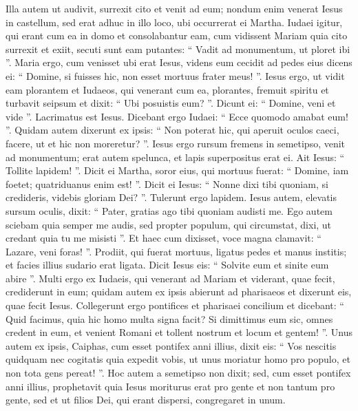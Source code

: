 \begin{biblechapter}
\begin{biblechapter}
\begin{biblechapter}
\begin{biblechapter}
\begin{biblechapter}
\begin{biblechapter}
\begin{biblechapter}
\begin{biblechapter}
\begin{biblechapter}
\begin{biblechapter}
\begin{biblechapter}
\verse Illa autem ut audivit, surrexit cito et venit ad eum; 
\verse nondum enim venerat Iesus in castellum, sed erat adhuc in illo loco, ubi occurrerat ei Martha. 
\verse Iudaei igitur, qui erant cum ea in domo et consolabantur eam, cum vidissent Mariam quia cito surrexit et exiit, secuti sunt eam putantes: “ Vadit ad monumentum, ut ploret ibi ”. 
\verse Maria ergo, cum venisset ubi erat Iesus, videns eum cecidit ad pedes eius dicens ei: “ Domine, si fuisses hic, non esset mortuus frater meus! ”. 
\verse Iesus ergo, ut vidit eam plorantem et Iudaeos, qui venerant cum ea, plorantes, fremuit spiritu et turbavit seipsum 
\verse et dixit: “ Ubi posuistis eum? ”. Dicunt ei: “ Domine, veni et vide ”. 
\verse Lacrimatus est Iesus. 
\verse Dicebant ergo Iudaei: “ Ecce quomodo amabat eum! ”. 
\verse Quidam autem dixerunt ex ipsis: “ Non poterat hic, qui aperuit oculos caeci, facere, ut et hic non moreretur? ”.
 \verse Iesus ergo rursum fremens in semetipso, venit ad monumentum; erat autem spelunca, et lapis superpositus erat ei. 
\verse Ait Iesus: “ Tollite lapidem! ”. Dicit ei Martha, soror eius, qui mortuus fuerat: “ Domine, iam foetet; quatriduanus enim est! ”. 
\verse Dicit ei Iesus: “ Nonne dixi tibi quoniam, si credideris, videbis gloriam Dei? ”. 
\verse Tulerunt ergo lapidem. Iesus autem, elevatis sursum oculis, dixit: “ Pater, gratias ago tibi quoniam audisti me. 
\verse Ego autem sciebam quia semper me audis, sed propter populum, qui circumstat, dixi, ut credant quia tu me misisti ”. 
\verse Et haec cum dixisset, voce magna clamavit: “ Lazare, veni foras! ”. 
\verse Prodiit, qui fuerat mortuus, ligatus pedes et manus institis; et facies illius sudario erat ligata. Dicit Iesus eis: “ Solvite eum et sinite eum abire ”. 
\verse Multi ergo ex Iudaeis, qui venerant ad Mariam et viderant, quae fecit, crediderunt in eum; 
 \verse quidam autem ex ipsis abierunt ad pharisaeos et dixerunt eis, quae fecit Iesus. 
\verse Collegerunt ergo pontifices et pharisaei concilium et dicebant: “ Quid facimus, quia hic homo multa signa facit? 
\verse Si dimittimus eum sic, omnes credent in eum, et venient Romani et tollent nostrum et locum et gentem! ”. 
\verse Unus autem ex ipsis, Caiphas, cum esset pontifex anni illius, dixit eis: “ Vos nescitis quidquam 
\verse nec cogitatis quia expedit vobis, ut unus moriatur homo pro populo, et non tota gens pereat! ”. 
\verse Hoc autem a semetipso non dixit; sed, cum esset pontifex anni illius, prophetavit quia Iesus moriturus erat pro gente 
\verse et non tantum pro gente, sed et ut filios Dei, qui erant dispersi, congregaret in unum. 

\end{biblechapter}
\end{biblechapter}
\end{biblechapter}
\end{biblechapter}
\end{biblechapter}
\end{biblechapter}
\end{biblechapter}
\end{biblechapter}
\end{biblechapter}
\end{biblechapter}
\end{biblechapter}
